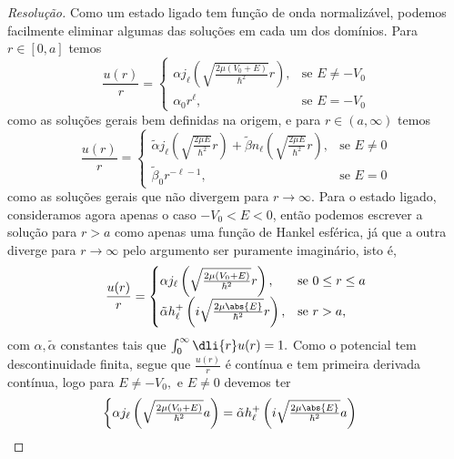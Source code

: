 \begin{proof}[Resolução]
    Como um estado ligado tem função de onda normalizável, podemos facilmente eliminar algumas das soluções em cada um dos domínios. Para \(r \in [0, a]\) temos
    \begin{equation*}
        \frac{u(r)}{r} = \begin{cases}
            \alpha j_{\ell}\left(\sqrt{\frac{2\mu(V_0 + E)}{\hbar^2}} r\right), &\text{se } E \neq -V_0\\
            \alpha_0 r^{\ell}, &\text{se } E = -V_0
        \end{cases}
    \end{equation*}
    como as soluções gerais bem definidas na origem, e para \(r \in (a, \infty)\) temos
    \begin{equation*}
        \frac{u(r)}{r} = \begin{cases}
            \tilde{\alpha}j_{\ell}\left(\sqrt{\frac{2\mu E}{\hbar^2}} r\right) + \tilde{\beta} n_{\ell}\left(\sqrt{\frac{2\mu E}{\hbar^2}}r\right),&\text{se } E\neq 0\\
            \tilde{\beta}_0 r^{-\ell - 1},&\text{se } E = 0
        \end{cases}
    \end{equation*}
    como as soluções gerais que não divergem para \(r \to \infty\). Para o estado ligado, consideramos agora apenas o caso \(-V_0 < E < 0\), então podemos escrever a solução para \(r > a\) como apenas uma função de Hankel esférica, já que a outra diverge para \(r \to \infty\) pelo argumento ser puramente imaginário, isto é,
    \begin{equation*}
        \frac{u(r)}{r} = \begin{cases}
            \alpha j_{\ell}\left(\sqrt{\frac{2\mu (V_0 + E)}{\hbar^2}}r\right),&\text{se } 0 \leq r \leq a\\
            \tilde{\alpha} h^+_{\ell}\left(i\sqrt{\frac{2\mu \abs{E}}{\hbar^2}}r\right),&\text{se } r > a,
        \end{cases}
    \end{equation*}
    com \(\alpha, \tilde{\alpha}\) constantes tais que \(\int_{0}^\infty \dli{r} u(r) = 1.\)
    Como o potencial tem descontinuidade finita, segue que \(\frac{u(r)}{r}\) é contínua e tem primeira derivada contínua, logo para \(E \neq -V_0,\) e \(E \neq 0\) devemos ter
    \begin{equation*}
        \begin{cases}
            \alpha j_\ell\left(\sqrt{\frac{2\mu(V_0 + E)}{\hbar^2}} a\right) = \tilde{\alpha} h^+_\ell\left(i\sqrt{\frac{2\mu\abs{E}}{\hbar^2}} a\right)\\

\end{cases}
\end{equation*}
\end{proof}
